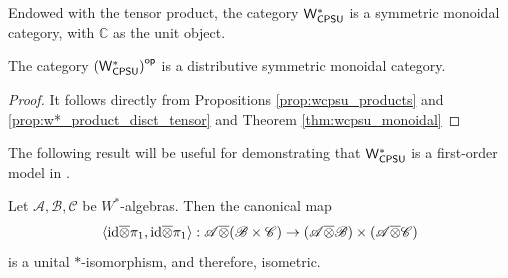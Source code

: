 \begin{theorem} \cite[Theorem 119 V]{westerbaanCategoryNeumannAlgebras2019} \label{thm:wcpsu_monoidal}
Endowed with the tensor product, the category $\mathsf{W^*_{CPSU}}$  is a symmetric monoidal category, with \( \mathbb{C} \) as the unit object.
\end{theorem}

\begin{theorem}
The category $\left(\mathsf{W^*_{CPSU}}\right)^{\mathsf{op}}$ is a distributive symmetric monoidal category.
\end{theorem}

\begin{proof}
  It follows directly from Propositions \ref{prop:wcpsu_products} and \ref{prop:w*_product_disct_tensor} and Theorem \ref{thm:wcpsu_monoidal}
\end{proof}

The following result will be useful for demonstrating that $\mathsf{W^*_{CPSU}}$ is a first-order model in .

\begin{theorem} \cite[Theorem 3.2]{choSemanticsQuantumProgramming2016} \label{thm:w*_tensor_distributes_product}
  Let \( \mathscr{A}, \mathscr{B}, \mathscr{C} \) be \(W^*\)-algebras. Then the canonical map
\[
 \langle \mathrm{id} \overline{\otimes} \pi_1, \mathrm{id} \overline{\otimes} \pi_1 \rangle : \mathscr{A} \overline{\otimes} (\mathscr{B} \times \mathscr{C}) \to (\mathscr{A} \overline{\otimes} \mathscr{B}) \times (\mathscr{A} \overline{\otimes} \mathscr{C})
\]
is a unital $*$-isomorphism, and therefore, isometric.
\end{theorem}








